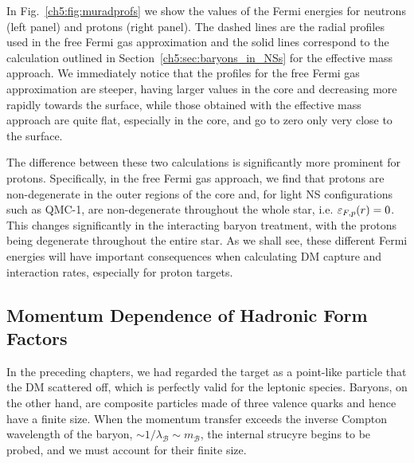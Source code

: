 In Fig.~\ref{ch5:fig:muradprofs} we show the values of the Fermi energies for neutrons (left panel) and protons (right panel). The dashed lines are the radial profiles used in the free Fermi gas approximation and the solid lines correspond to the calculation outlined in Section~\ref{ch5:sec:baryons_in_NSs} for the effective mass approach. We immediately notice that the profiles for the free Fermi gas approximation are steeper, having larger values in the core and decreasing more rapidly towards the surface, while those obtained with the effective mass approach are quite flat, especially in the core, and go to zero only very close to the surface.

The difference between these two calculations is significantly more prominent for protons. Specifically, in the free Fermi gas approach, we find that protons are non-degenerate in the outer regions of the core and, for light NS configurations such as QMC-1, are non-degenerate throughout the whole star, i.e. $\varepsilon_{F,p}(r) = 0$.
This changes significantly in the interacting baryon treatment, with the protons being degenerate throughout the entire star.
As we shall see, these different Fermi energies will have important consequences when calculating DM capture and interaction rates, especially for proton targets.


\subsection{Momentum Dependence of Hadronic Form Factors}
\label{ch5:subsec:mom_dep_FF}

In the preceding chapters, we had regarded the target as a point-like particle that the DM scattered off, which is perfectly valid for the leptonic species. Baryons, on the other hand, are composite particles made of three valence quarks and hence have a finite size. When the momentum transfer exceeds the inverse Compton wavelength of the baryon, $\sim 1/\lambda_\mathcal{B} \sim m_\mathcal{B}$, the internal strucyre begins to be probed, and we must account for their finite size.

